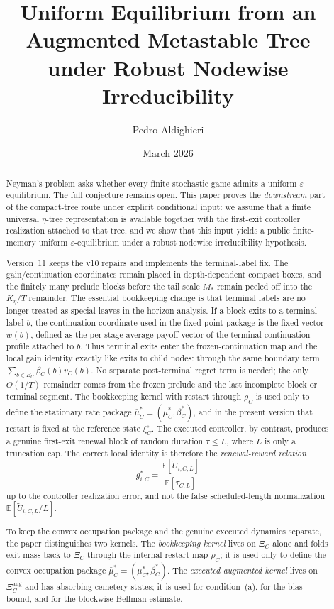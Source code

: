 \documentclass[12pt]{article}
\title{\textbf{Uniform Equilibrium from an Augmented Metastable Tree\\under Robust Nodewise Irreducibility}}
\author{Pedro Aldighieri}
\date{March 2026}
\theoremstyle{definition}
\newcommand{\eps}{\varepsilon}
\newcommand{\E}{\mathbb{E}}
\newcommand{\1}{\mathbf{1}}
\begin{document}
\maketitle



\begin{abstract}
Neyman's problem asks whether every finite stochastic game admits a uniform
$\eps$-equilibrium. The full conjecture remains open. This paper proves the
\emph{downstream} part of the compact-tree route under explicit conditional input:
we assume that a finite universal $\eta$-tree representation is available together
with the first-exit controller realization attached to that tree, and we show that
this input yields a public finite-memory uniform $\eps$-equilibrium under a robust
nodewise irreducibility hypothesis.

Version~11 keeps the v10 repairs and implements the terminal-label fix.
The gain/continuation coordinates remain placed in depth-dependent compact
boxes, and the finitely many prelude blocks before the tail scale $M_*$ remain
peeled off into the $K_\eta/T$ remainder. The essential bookkeeping change is
that terminal labels are no longer treated as special leaves in the horizon
analysis. If a block exits to a terminal label $b$, the continuation coordinate
used in the fixed-point package is the fixed vector $w(b)$, defined as the
per-stage average payoff vector of the terminal continuation profile attached to
$b$. Thus terminal exits enter the frozen-continuation map and the local gain
identity exactly like exits to child nodes: through the same boundary term
$\sum_{b\in B_C}\beta_C(b)v_C(b)$. No separate post-terminal regret term is
needed; the only $O(1/T)$ remainder comes from the frozen prelude and the last
incomplete block or terminal segment. The bookkeeping kernel with restart
through $\rho_C$ is used only to define the stationary rate package
$\bar\mu_C^*=(\mu_C^*,\beta_C^*)$, and in the present version that restart is
fixed at the reference state $\xi_C^\circ$. The executed controller, by
contrast, produces a genuine first-exit renewal block of random duration
$\tau\le L$, where $L$ is only a truncation cap. The correct local identity is
therefore the \emph{renewal-reward relation}
\[
g_{i,C}^*
=
\frac{\E[\widetilde U_{i,C,L}]}{\E[\tau_{C,L}]}
\]
up to the controller realization error, and not the false scheduled-length
normalization $\E[\widetilde U_{i,C,L}/L]$.

To keep the convex occupation package and the genuine executed dynamics separate,
the paper distinguishes two kernels. The \emph{bookkeeping kernel} lives on
$\Xi_C$ alone and folds exit mass back to $\Xi_C$ through the internal restart map
$\rho_C$; it is used only to define the convex occupation package
$\bar\mu_C^*=(\mu_C^*,\beta_C^*)$. The \emph{executed augmented kernel} lives on
$\Xi_C^{\mathrm{aug}}$ and has absorbing cemetery states; it is used for
condition~\textnormal{(a)}, for the bias bound, and for the blockwise Bellman
estimate.


\end{abstract}
\end{document}
